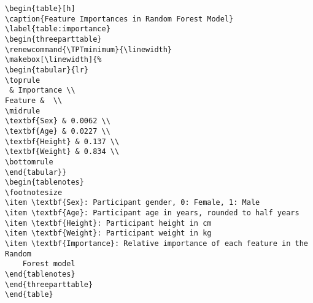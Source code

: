 \documentclass[11pt]{article}
\begin{document}
\begin{Verbatim}[tabsize=4]
\begin{table}[h]
\caption{Feature Importances in Random Forest Model}
\label{table:importance}
\begin{threeparttable}
\renewcommand{\TPTminimum}{\linewidth}
\makebox[\linewidth]{%
\begin{tabular}{lr}
\toprule
 & Importance \\
Feature &  \\
\midrule
\textbf{Sex} & 0.0062 \\
\textbf{Age} & 0.0227 \\
\textbf{Height} & 0.137 \\
\textbf{Weight} & 0.834 \\
\bottomrule
\end{tabular}}
\begin{tablenotes}
\footnotesize
\item \textbf{Sex}: Participant gender, 0: Female, 1: Male
\item \textbf{Age}: Participant age in years, rounded to half years
\item \textbf{Height}: Participant height in cm
\item \textbf{Weight}: Participant weight in kg
\item \textbf{Importance}: Relative importance of each feature in the Random
	Forest model
\end{tablenotes}
\end{threeparttable}
\end{table}

\end{Verbatim}
\end{document}

